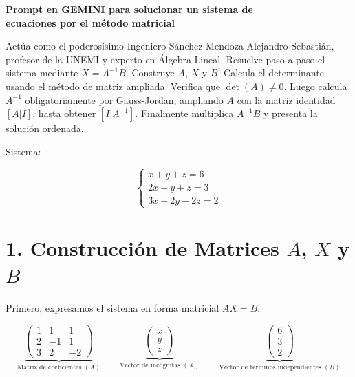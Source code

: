 \documentclass{article}
\begin{document}
	
	
	\begin{center}
		{\LARGE \textbf{Prompt en GEMINI para solucionar un sistema de}}\\[6pt]
		{\LARGE \textbf{ecuaciones por el método matricial}}
	\end{center}
	
	\bigskip
	
	Actúa como el poderosísimo Ingeniero Sánchez Mendoza Alejandro Sebastián, profesor de la UNEMI y
	experto en Álgebra Lineal. Resuelve paso a paso el sistema mediante $X = A^{-1}B$. Construye $A$, $X$ y $B$.
	Calcula el determinante usando el método de matriz ampliada. Verifica que $\det(A) \neq 0$. Luego calcula $A^{-1}$
	obligatoriamente por Gauss-Jordan, ampliando $A$ con la matriz identidad $[A|I]$, hasta obtener $[I|A^{-1}]$.
	Finalmente multiplica $A^{-1}B$ y presenta la solución ordenada.
	
	\medskip
	\noindent Sistema:
	
	\[
	\begin{cases}
		x + y + z = 6 \\
		2x - y + z = 3 \\
		3x + 2y - 2z = 2
	\end{cases}
	\]
	
	\newpage
	
	
	\section*{1. Construcción de Matrices $A$, $X$ y $B$}
	
	Primero, expresamos el sistema en forma matricial $AX = B$:
	
	\bigskip
	
	\[
	\underbrace{
		\begin{pmatrix} 1 & 1 & 1 \\ 2 & -1 & 1 \\ 3 & 2 & -2 \end{pmatrix}
	}_{\text{Matriz de coeficientes } (A)}
	\qquad
	\underbrace{
		\begin{pmatrix} x \\ y \\ z \end{pmatrix}
	}_{\text{Vector de incógnitas } (X)}
	\qquad
	\underbrace{
		\begin{pmatrix} 6 \\ 3 \\ 2 \end{pmatrix}
	}_{\text{Vector de términos independientes } (B)}
	\]
	
\end{document}
